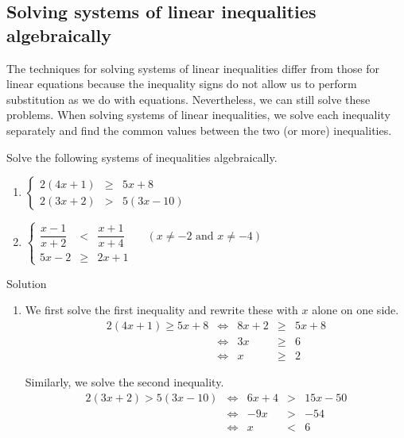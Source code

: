 \subsection{Solving systems of linear inequalities algebraically}\label{syst_lin_ineq_alg}
The techniques for solving systems of linear inequalities differ from those for linear equations because the inequality signs do not allow us to perform substitution as we do with equations. Nevertheless, we can still solve these problems. When solving systems of linear inequalities, we solve each inequality separately and find the common values between the two (or more) inequalities. 

\begin{example}
Solve the following systems of inequalities algebraically.	
	
\begin{enumerate}
	\item $ \left\{\begin{array}{rcl}
	2(4x+1) & \geq &5x+8 \\
	2(3x+2) & >         &5(3x-10)
	\end{array}\right. $	
	
	\item $\left\{\begin{array}{rcl}
		\dfrac{x-1}{x+2}  & <	&\dfrac{x+1}{x+4} \qquad  (x\neq -2 \text{ and } x\neq -4) \\[0.1cm]
		5x-2		  &\geq &2x+1
	\end{array}\right.	$
\end{enumerate}	

\ifvc\pagebreak\fi
{}Solution 	
	
	
\begin{enumerate}
\item
 
We first solve the first inequality and rewrite these with $x$ alone on one side.
\[\begin{array}{rcrcl}
	2(4x+1) \geq 5x+8 	&\Leftrightarrow& 8x+2 & \geq &  5x+8 \\
	&\Leftrightarrow& 3x & \geq & 6 \\
	&\Leftrightarrow& x & \geq & 2
\end{array}
\]

Similarly, we solve the second inequality.
\[\begin{array}{rcrcl}
	2(3x+2) >   5(3x-10)	&\Leftrightarrow& 6x+4 & > &15x-50 \\
	&\Leftrightarrow& -9x & > & -54\\
	&\Leftrightarrow& x & < &6
\end{array}
\]



\end{enumerate}
\end{example}
